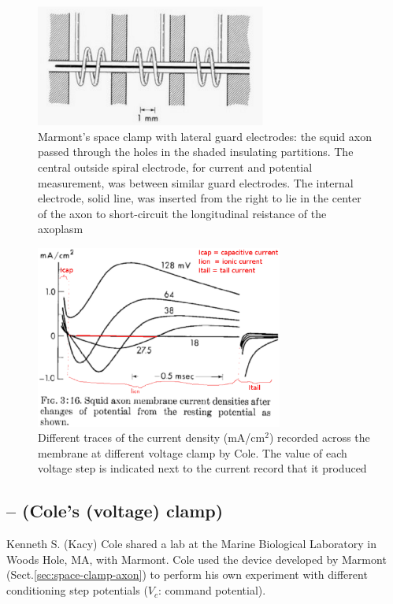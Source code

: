 \begin{figure}[hbt]
  \centerline{
\includegraphics[height=4cm,
    angle=0]{./images/space-clamp-axon.eps}
    }
\caption{Marmont's space clamp with lateral guard electrodes: the squid axon
passed through the holes in the shaded insulating partitions. The central
outside spiral electrode, for current and potential measurement, was between
similar guard electrodes. The internal electrode, solid line, was inserted from
the right to lie in the center of the axon to short-circuit the longitudinal
reistance of the axoplasm}
\label{fig:space-clamp-axon}
\end{figure}



\begin{figure}[htbp]
\centerline{\includegraphics[height=6cm]{./images/voltage-clamp-Cole.eps}}
\caption{Different traces of the current density (mA/cm$^2$) recorded across the
membrane at different voltage clamp by Cole. The value of each voltage step is
indicated next to the current record that it produced}
\label{fig:Vm-clamp-Cole}
\end{figure}

\subsection{-- (Cole's (voltage) clamp)}
\label{sec:voltage-clamp-Cole-Marmont}

Kenneth S. (Kacy) Cole shared a lab at the Marine Biological Laboratory in Woods
Hole, MA, with Marmont. Cole used the device developed by Marmont
(Sect.\ref{sec:space-clamp-axon}) to perform his own experiment with different
conditioning step potentials ($V_c$: command potential).

